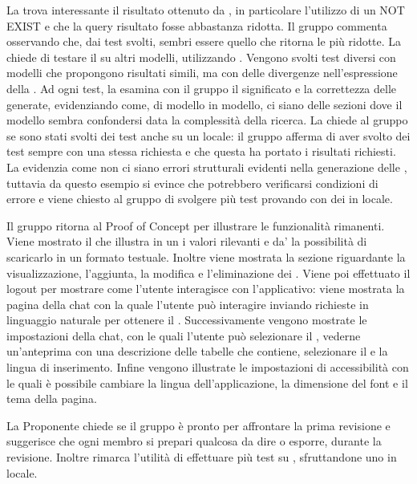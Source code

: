 \par La  trova interessante il risultato ottenuto da , in particolare l'utilizzo di un NOT EXIST e che la query risultato fosse abbastanza ridotta. Il gruppo commenta osservando che, dai test svolti,  sembri essere quello che ritorna le   più ridotte.
La  chiede di testare il  su altri modelli, utilizzando . Vengono svolti test diversi con modelli che propongono risultati simili, ma con delle divergenze nell'espressione della . Ad ogni test, la  esamina con il gruppo il significato e la correttezza delle   generate, evidenziando come, di modello in modello, ci siano delle sezioni dove il modello sembra confondersi data la complessità della ricerca.
La  chiede al gruppo se sono stati svolti dei test anche su un  locale: il gruppo afferma di aver svolto dei test sempre con una stessa richiesta e che questa ha portato i risultati richiesti.
La  evidenzia come non ci siano errori strutturali evidenti nella generazione delle , tuttavia da questo esempio si evince che potrebbero verificarsi condizioni di errore e viene chiesto al gruppo di svolgere più test provando con dei  in locale.

\par Il gruppo ritorna al Proof of Concept per illustrare le funzionalità rimanenti. Viene mostrato il  che illustra in un  i valori rilevanti e da' la possibilità di scaricarlo in un formato testuale. Inoltre viene mostrata la sezione riguardante la visualizzazione, l'aggiunta, la modifica e l'eliminazione dei .
Viene poi effettuato il logout per mostrare come l'utente interagisce con l'applicativo: viene mostrata la pagina della chat con la quale l'utente può interagire inviando richieste in linguaggio naturale per ottenere il . Successivamente vengono mostrate le impostazioni della chat, con le quali l'utente può selezionare il , vederne un'anteprima con una descrizione delle tabelle che contiene, selezionare il  e la lingua di inserimento.
Infine vengono illustrate le impostazioni di accessibilità con le quali è possibile cambiare la lingua dell'applicazione, la dimensione del font e il tema della pagina.

\par La Proponente chiede se il gruppo è pronto per affrontare la prima revisione e suggerisce che ogni membro si prepari qualcosa da dire o esporre, durante la revisione. Inoltre rimarca l'utilità di effettuare più test su , sfruttandone uno in locale.

